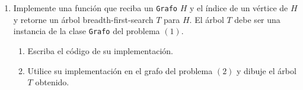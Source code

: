 \documentclass[12pt, a4paper]{article}
\begin{document}
\begin{enumerate}
\item Implemente una funci\'on que reciba un \texttt{Grafo} $H$ y el \'indice de un v\'ertice de $H$ y retorne un árbol breadth-first-search $T$ para $H$. El árbol $T$ debe ser una instancia de la clase \texttt{Grafo} del problema $(1)$.

\begin{enumerate}
\item Escriba el c\'odigo de su implementaci\'on.
\item Utilice su implementaci\'on en el grafo del problema $(2)$ y dibuje el \'arbol $T$ obtenido.
\end{enumerate}


\end{enumerate}
\end{document}
